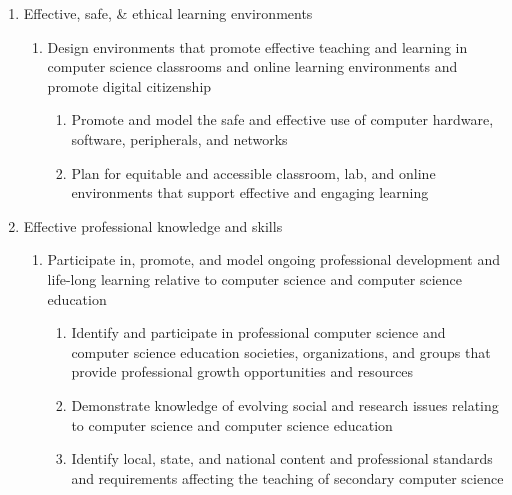 \begin{enumerate}
	\item Effective, safe, \& ethical learning environments
	\begin{enumerate} 												
		\item Design environments that promote effective teaching and learning in computer science classrooms and online learning environments and promote digital citizenship 
		\begin{enumerate}
			\item Promote and model the safe and effective use of computer hardware, software, peripherals, and networks				
			\item Plan for equitable and accessible classroom, lab, and online environments that support effective and engaging learning
		\end{enumerate}	
	\end{enumerate}	
	\item Effective professional knowledge and skills
	\begin{enumerate}
		\item Participate in, promote, and model ongoing professional development and life-long learning relative to computer science and computer science education	
		\begin{enumerate}				
			\item Identify and participate in professional computer science and computer science education societies, organizations, and groups that provide professional growth opportunities and resources				
			\item Demonstrate knowledge of evolving social and research issues relating to computer science and computer science education 				
			\item Identify local, state, and national content and professional standards and requirements affecting the teaching of secondary computer science	
		\end{enumerate}		
	\end{enumerate}	
\end{enumerate}			